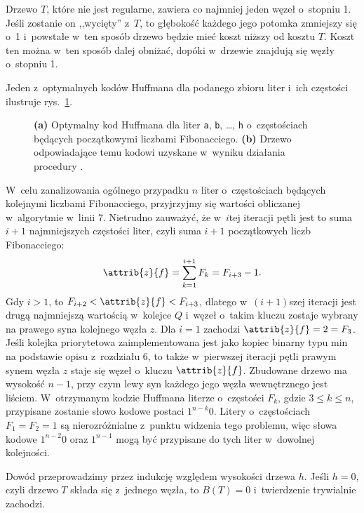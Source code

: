 
\exercise %
Drzewo $T$, które nie jest regularne, zawiera co najmniej jeden węzeł o~stopniu 1.
Jeśli zostanie on ,,wycięty'' z~$T$, to głębokość każdego jego potomka zmniejszy się o~1 i~powstałe w~ten sposób drzewo będzie mieć koszt niższy od kosztu $T$.
Koszt ten można w~ten sposób dalej obniżać, dopóki w~drzewie znajdują się węzły o~stopniu 1.

\exercise %
Jeden z~optymalnych kodów Huffmana dla podanego zbioru liter i~ich częstości ilustruje rys.\ \ref{fig:16.3-2}.
\begin{figure}[!ht]
	\centering 
	\caption{{\sffamily\bfseries(a)} Optymalny kod Huffmana dla liter \texttt{a}, \texttt{b}, \dots, \texttt{h} o~częstościach będących początkowymi liczbami Fibonacciego.
{\sffamily\bfseries(b)} Drzewo odpowiadające temu kodowi uzyskane w~wyniku działania procedury .} \label{fig:16.3-2}
\end{figure}

W~celu zanalizowania ogólnego przypadku $n$ liter o~częstościach będących kolejnymi liczbami Fibonacciego, przyjrzyjmy się wartości  obliczanej w~algorytmie  w~linii 7.
Nietrudno zauważyć, że w~$i$\nbhyphen tej iteracji pętli  jest to suma $i+1$ najmniejszych częstości liter, czyli suma $i+1$ początkowych liczb Fibonacciego:
\[
	\attrib{z}{f} = \sum_{k=1}^{i+1}F_k = F_{i+3}-1.
\]
Gdy $i>1$, to $F_{i+2}<\attrib{z}{f}<F_{i+3}$, dlatego  w~$(i+1)$\nbhyphen szej iteracji jest drugą najmniejszą wartością w~kolejce $Q$ i~węzeł o~takim kluczu zostaje wybrany na prawego syna kolejnego węzła $z$.
Dla $i=1$ zachodzi $\attrib{z}{f}=2=F_3$.
Jeśli kolejka priorytetowa zaimplementowana jest jako kopiec binarny typu min na podstawie opisu z~rozdziału 6, to także w~pierwszej iteracji pętli prawym synem węzła $z$ staje się węzeł o~kluczu $\attrib{z}{f}$.
Zbudowane drzewo ma wysokość $n-1$, przy czym lewy syn każdego jego węzła wewnętrznego jest liściem.
W~otrzymanym kodzie Huffmana literze o~częstości $F_k$, gdzie $3\le k\le n$, przypisane zostanie słowo kodowe postaci $1^{n-k}0$.
Litery o~częstościach $F_1=F_2=1$ są nierozróżnialne z~punktu widzenia tego problemu, więc słowa kodowe $1^{n-2}0$ oraz $1^{n-1}$ mogą być przypisane do tych liter w~dowolnej kolejności.

\exercise %
Dowód przeprowadzimy przez indukcję względem wysokości drzewa $h$.
Jeśli $h=0$, czyli drzewo $T$ składa się z~jednego węzła, to $B(T)=0$ i~twierdzenie trywialnie zachodzi.

